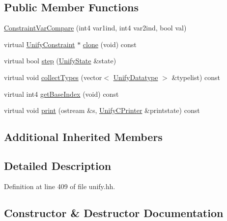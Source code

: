 \subsection*{Public Member Functions}
\begin{DoxyCompactItemize}
\item 
\mbox{\hyperlink{class_constraint_var_compare_af7d5ed5a49936f51e8bc2402723d29b5}{Constraint\+Var\+Compare}} (int4 var1ind, int4 var2ind, bool val)
\item 
virtual \mbox{\hyperlink{class_unify_constraint}{Unify\+Constraint}} $\ast$ \mbox{\hyperlink{class_constraint_var_compare_adc69772066381dd17190c552d5efe0d5}{clone}} (void) const
\item 
virtual bool \mbox{\hyperlink{class_constraint_var_compare_a730b6edfacbee486efdea1e91b6509cd}{step}} (\mbox{\hyperlink{class_unify_state}{Unify\+State}} \&state)
\item 
virtual void \mbox{\hyperlink{class_constraint_var_compare_a8ffefd1d6865a0d95ef078fc085fbedc}{collect\+Types}} (vector$<$ \mbox{\hyperlink{class_unify_datatype}{Unify\+Datatype}} $>$ \&typelist) const
\item 
virtual int4 \mbox{\hyperlink{class_constraint_var_compare_acdf5a965736247512e0b96ca53c13aa8}{get\+Base\+Index}} (void) const
\item 
virtual void \mbox{\hyperlink{class_constraint_var_compare_ac79fc149c90e867dc3138c186b979b68}{print}} (ostream \&s, \mbox{\hyperlink{class_unify_c_printer}{Unify\+C\+Printer}} \&printstate) const
\end{DoxyCompactItemize}
\subsection*{Additional Inherited Members}


\subsection{Detailed Description}


Definition at line 409 of file unify.\+hh.



\subsection{Constructor \& Destructor Documentation}
\mbox{\label{class_constraint_var_compare_af7d5ed5a49936f51e8bc2402723d29b5}} 
